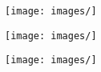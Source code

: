     
    
\begin{figure}[!htb]
    \begin{minipage}{0.48\textwidth}
        \centering
        \texttt{[image: images/]}
    \end{minipage}\hfill
    
    \begin{minipage}{0.48\textwidth} 
        \centering
        \texttt{[image: images/]}
    \end{minipage}
\end{figure}
    
    
\begin{figure}[!h]
    \centering
    \texttt{[image: images/]}
    \caption{}
\end{figure}